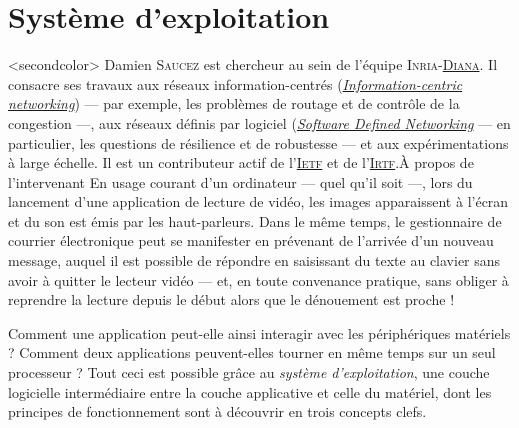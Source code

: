 \section[Système d’exploitation]{Système d’exploitation}
\label{sec:I.2}

\caution[t]<secondcolor>{%
Damien \textsc{Saucez} est chercheur au sein de l'équipe  \textsc{Inria}-\href{https://www.inria.fr/equipes/diana}{\textsc{Diana}}. Il consacre ses travaux aux réseaux information-centrés (\href{https://en.wikipedia.org/wiki/Information-centric_networking}{\textit{Information-centric networking}}) --- par exemple, les problèmes de routage et de contrôle de la congestion ---, aux réseaux définis par logiciel (\href{https://fr.wikipedia.org/wiki/Software-defined_networking}{\textit{Software Defined Networking}} --- en particulier, les questions de résilience et de robustesse --- et aux expérimentations à large échelle. Il est un contributeur actif de l'\href{https://en.wikipedia.org/wiki/Internet_Engineering_Task_Force}{\textsc{Ietf}} et de l'\href{https://en.wikipedia.org/wiki/Internet_Research_Task_Force}{\textsc{Irtf}}.}{À propos de l'intervenant}
En usage courant d'un ordinateur --- quel qu'il soit ---, lors du lancement d'une application de lecture de vidéo, les images apparaissent à l'écran et du son est émis par les haut-parleurs. Dans le même temps, le gestionnaire de courrier électronique peut se manifester en prévenant de l'arrivée d'un nouveau message, auquel il est possible de répondre en saisissant du texte au clavier sans avoir à quitter le lecteur vidéo --- et, en toute convenance pratique, sans obliger à reprendre la lecture depuis le début alors que le dénouement est proche !

Comment une application peut-elle ainsi interagir avec les périphériques matériels ? Comment deux applications peuvent-elles tourner en même temps sur un seul processeur ? Tout ceci est possible grâce au \emph{système d'exploitation}, une couche logicielle intermédiaire entre la couche applicative et celle du matériel, dont les principes de fonctionnement sont à découvrir en trois concepts clefs.

